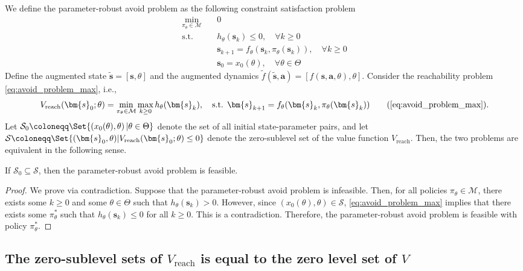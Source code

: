 \documentclass{article} %
\def\vb{{\bm{b}}}
\def\vu{{\bm{u}}}
\def\vx{{\bm{x}}}
\def\vu{{\vb{u}}}
\def\vx{{\vb{x}}}
\def\vx{{\bm{s}}}
\def\vu{{\bm{a}}}
\begin{document}
We define the parameter-robust avoid problem as the following constraint satisfaction problem
\begin{align}
    \min_{\pi_\theta \in \mathcal{M}} &\quad 0 \\
    \text{s.t.} &\quad h_\theta(\vx_k) \leq 0, \quad \forall k \geq 0 \\
    &\quad \vx_{k+1} = f_\theta(\vx_k, \pi_\theta(\vx_k)), \quad \forall k \geq 0 \\
    &\quad \vx_0 = x_0(\theta), \quad \forall \theta \in \Theta
\end{align}
Define the augmented state $\tilde{\vx} = [\vx, \theta]$ and the augmented dynamics $\tilde{f}(\tilde{\vx}, \vu) = [f(\vx, \vu, \theta), \theta]$.
Consider the reachability problem \eqref{eq:avoid_problem_max}, i.e.,
\begin{equation}
    V_{\text{reach}}(\vx_0; \theta) = \min_{\pi_\theta \in \mathcal{M}} \max_{k \geq 0} h_\theta(\vx_k), \quad \text{s.t.  } \vx_{k+1} = f_\theta(\vx_k, \pi_\theta(\vx_k)) \tag{\ref{eq:avoid_problem_max}}.
\end{equation}
Let $\mathcal{S}_0 \coloneqq \Set{ (x_0(\theta), \theta)\, | \theta \in \Theta }$ denote the set of all initial state-parameter pairs, and
let $\mathcal{S} \coloneqq \Set{ (\vx_0, \theta) | V_{\text{reach}}(\vx_0; \theta) \leq 0 }$ denote the zero-sublevel set of the value function $V_{\text{reach}}$.
Then, the two problems are equivalent in the following sense.
\begin{prop}
    If $\mathcal{S}_0 \subseteq \mathcal{S}$, then the parameter-robust avoid problem is feasible. 
\end{prop}
\begin{proof}
    We prove via contradiction.
    Suppose that the parameter-robust avoid problem is infeasible.
    Then, for all policies $\pi_\theta \in \mathcal{M}$, there exists some $k \geq 0$ and some $\theta \in \Theta$ such that $h_\theta(\vx_k) > 0$.
    However, since $(x_0(\theta), \theta) \in \mathcal{S}$, \eqref{eq:avoid_problem_max} implies that there exists some $\pi^*_\theta$ such that $h_\theta(\vx_k) \leq 0$ for all $k \geq 0$. This is a contradiction. Therefore, the parameter-robust avoid problem is feasible with policy $\pi_\theta^*$.
\end{proof}

\subsection{The zero-sublevel sets of $V_{\text{reach}}$ is equal to the zero level set of $V$} \label{app:proof:reach_avoid_equivalence}
\end{document}
